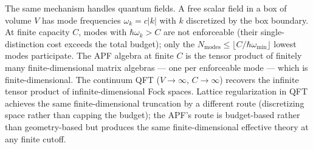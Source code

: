 \documentclass[11pt]{article}
\theoremstyle{remark}
\begin{document}
The same mechanism handles quantum fields.  A free scalar field in a box of volume $V$ has mode frequencies $\omega_k = c|k|$ with $k$ discretized by the box boundary.  At finite capacity $C$, modes with $\hbar\omega_k > C$ are not enforceable (their single-distinction cost exceeds the total budget); only the $N_{\mathrm{modes}} \le \lfloor C/\hbar\omega_{\min}\rfloor$ lowest modes participate.  The APF algebra at finite $C$ is the tensor product of finitely many finite-dimensional matrix algebras --- one per enforceable mode --- which is finite-dimensional.  The continuum QFT ($V \to \infty$, $C \to \infty$) recovers the infinite tensor product of infinite-dimensional Fock spaces.  Lattice regularization in QFT achieves the same finite-dimensional truncation by a different route (discretizing space rather than capping the budget); the APF's route is budget-based rather than geometry-based but produces the same finite-dimensional effective theory at any finite cutoff.
\end{document}
